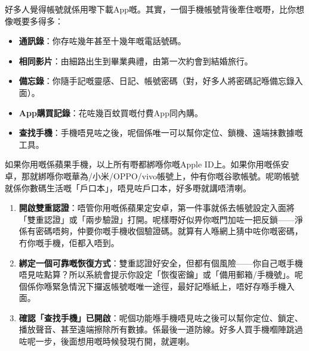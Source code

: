


好多人覺得帳號就係用嚟下載App嘅。其實，一個手機帳號背後牽住嘅嘢，比你想像嘅要多得多：

\begin{itemize}
  \item \textbf{通訊錄}：你存咗幾年甚至十幾年嘅電話號碼。
  \item \textbf{相同影片}：由細路出生到畢業典禮，由第一次約會到結婚旅行。
  \item \textbf{備忘錄}：你隨手記嘅靈感、日記、帳號密碼（對，好多人將密碼記喺備忘錄入面）。
  \item \textbf{App購買記錄}：花咗幾百蚊買嘅付費App同內購。
  \item \textbf{查找手機}：手機唔見咗之後，呢個係唯一可以幫你定位、鎖機、遠端抹數據嘅工具。
\end{itemize}

如果你用嘅係蘋果手機，以上所有嘢都綁喺你嘅Apple ID上。如果你用嘅係安卓，那就綁喺你嘅華為/小米/OPPO/vivo帳號上，仲有你嘅谷歌帳號。呢啲帳號就係你數碼生活嘅「戶口本」，唔見咗戶口本，好多嘢就講唔清喇。


\begin{enumerate}
  \item \textbf{開啟雙重認證}：唔管你用嘅係蘋果定安卓，第一件事就係去帳號設定入面將「雙重認證」或「兩步驗證」打開。呢樣嘢好似畀你嘅門加咗一把反鎖——淨係有密碼唔夠，仲要你嘅手機收個驗證碼。就算有人喺網上猜中咗你嘅密碼，冇你嘅手機，佢都入唔到。
  \item \textbf{綁定一個可靠嘅恢復方式}：雙重認證好安全，但都有個風險——你自己嘅手機唔見咗點算？所以系統會提示你設定「恢復密鑰」或「備用郵箱/手機號」。呢個係你喺緊急情況下攞返帳號嘅唯一途徑，最好記喺紙上，唔好存喺手機入面。
  \item \textbf{確認「查找手機」已開啟}：呢個功能喺手機唔見咗之後可以幫你定位、鎖定、播放聲音、甚至遠端擦除所有數據。係最後一道防線。好多人買手機嗰陣跳過咗呢一步，後面想用嘅時候發現冇開，就遲喇。
\end{enumerate}


